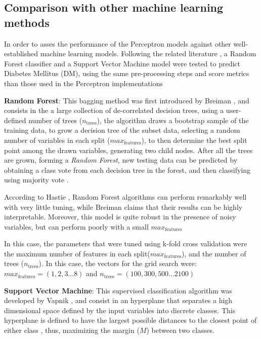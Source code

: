 \documentclass[10pt,twocolumn,letterpaper]{article}
\begin{document}
\subsection{Comparison with other machine learning methods}

In order to asses the performance of the Perceptron models against other well-established machine learning models. Following the related literature \cite{Xu2017,Santhanam2015}, a Random Forest classifier and a Support Vector Machine model were tested to predict Diabetes Mellitus (DM), using the same pre-processing steps and score metrics than those used in the Perceptron implementations

\textbf{Random Forest}: This bagging method was first introduced by Breiman \cite{Breiman2001b}, and consists in the a large collection of de-correlated decision trees, using a user-defined number of trees ($n_\mathrm{trees}$), the algorithm draws a bootstrap sample of the training data, to grow a decision tree of the subset data, selecting a random number of variables in each split ($max_\mathrm{features}$), to then determine the best split point among the drawn variables, generating two child nodes. After all the trees are grown, forming a \emph{Random Forest}, new testing data can be predicted by obtaining a class vote from each decision tree in the forest, and then classifying using majority vote \cite{Hastie2009}.

According to Hastie \cite{Hastie2009}, Random Forest algorithms can perform remarkably well with very little tuning, while Breiman \cite{Breiman2001b} claims that their results can be highly interpretable. Moreover, this model is quite robust in the presence of noisy variables, but can perform poorly with a small $max_\mathrm{features}$ \cite{Breiman2001b}

In this case, the parameters that were tuned using k-fold cross validation were the maximum number of features in each split($max_\mathrm{features}$), and the number of trees ($n_\mathrm{trees}$). In this case, the vectors for the grid search were: $max_\mathrm{features} = (1,2,3...8)$ and $n_\mathrm{trees} = (100,300,500...2100)$

\textbf{Support Vector Machine}: This supervised classification algorithm was developed by Vapnik \cite{Vapnik1995}, and consist in an hyperplane that separates a high dimensional space defined by the input variables into discrete classes. This hyperplane is defined to have the largest possible distances to the closest point of either class \cite{Hastie2009}, thus, maximizing the margin ($M$) between two classes. 
\end{document}
